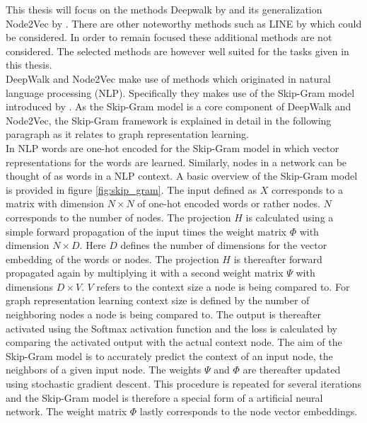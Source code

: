 	\noindent This thesis will focus on the methods Deepwalk by
	\cite{perozzi2014deepwalk} and its generalization Node2Vec by
	\cite{grover2016node2vec}. There are other noteworthy methods such as LINE
	by \cite{tang2015line} which could be considered. In order to remain
	focused these additional methods are not considered. The selected methods
	are however well suited for the tasks given in this thesis. \\

	\noindent DeepWalk and Node2Vec make use of methods which originated in 
	natural language processing (NLP). Specifically they makes use of the 
	Skip-Gram model introduced by
	\cite{mikolov2013efficient,mikolov2013distributed}. As the Skip-Gram model
	is a core component of DeepWalk and Node2Vec, the Skip-Gram framework is
	explained in detail in the following paragraph as it relates to graph
	representation learning. \\


	\noindent In NLP words are one-hot encoded for the Skip-Gram model in which 
	vector representations for the words are learned. Similarly, nodes in a network 
	can be thought of as words in a NLP context. A basic overview of the Skip-Gram 
	model is provided in figure \ref{fig:skip_gram}. The input defined as $X$ corresponds to 
	a matrix with dimension $N \times N$ of one-hot encoded words or rather nodes. 
	$N$ corresponds to the number of nodes. The projection $H$ is calculated using 
	a simple forward propagation of the input times the weight matrix $\Phi$ with 
	dimension $N \times D$. Here $D$ defines the number of dimensions for the 
	vector embedding of the words or nodes. The projection $H$ is thereafter 
	forward propagated again by multiplying it with a second weight matrix $\Psi$ 
	with dimensions $D \times V$. $V$ refers to the context size a node is being 
	compared to. For graph representation learning context size is defined by the 
	number of neighboring nodes a node is being compared to. The output is thereafter 
	activated using the Softmax activation function and the loss is calculated
	by comparing the activated output with the actual context node. The
	aim of the Skip-Gram model is to accurately predict the context of an input
	node, the neighbors of a given input node. The weights $\Psi$ and 
	$\Phi$ are thereafter updated using stochastic gradient descent. This procedure is 
	repeated for several iterations and the Skip-Gram model is therefore a 
	special form of a artificial neural network. The weight matrix $\Phi$ lastly 
	corresponds to the node vector embeddings. \\ 


